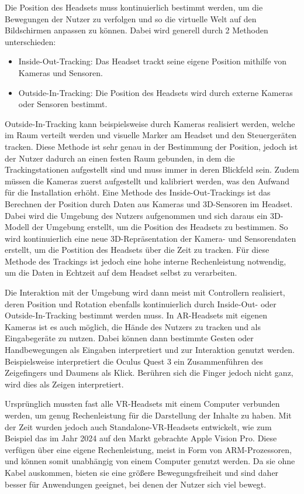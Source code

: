     Die Position des Headsets muss kontinuierlich bestimmt werden, um die Bewegungen der Nutzer zu verfolgen und so die virtuelle Welt auf den Bildschirmen anpassen zu können.
    Dabei wird generell durch 2 Methoden unterschieden:
    \begin{itemize}
      \item Inside-Out-Tracking: Das Headset trackt seine eigene Position mithilfe von Kameras und Sensoren.
      \item Outside-In-Tracking: Die Position des Headsets wird durch externe Kameras oder Sensoren bestimmt.
    \end{itemize}
    \autocite[]{Gourlay2017}

    Outside-In-Tracking kann beispielsweise durch Kameras realisiert werden, welche im Raum verteilt werden und visuelle Marker am Headset und den Steuergeräten tracken.
    Diese Methode ist sehr genau in der Bestimmung der Position, jedoch ist der Nutzer dadurch an einen festen Raum gebunden, in dem die Trackingstationen aufgestellt sind und muss immer in deren Blickfeld sein.
    Zudem müssen die Kameras zuerst aufgestellt und kalibriert werden, was den Aufwand für die Installation erhöht.
    Eine Methode des Inside-Out-Trackings ist das Berechnen der Position durch Daten aus Kameras und 3D-Sensoren im Headset.
    Dabei wird die Umgebung des Nutzers aufgenommen und sich daraus ein 3D-Modell der Umgebung erstellt, um die Position des Headsets zu bestimmen.
    So wird kontinuierlich eine neue 3D-Repräsentation der Kamera- und Sensorendaten erstellt, um die Postition des Headsets über die Zeit zu tracken.
    Für diese Methode des Trackings ist jedoch eine hohe interne Rechenleistung notwendig, um die Daten in Echtzeit auf dem Headset selbst zu verarbeiten.

    Die Interaktion mit der Umgebung wird dann meist mit Controllern realisiert, deren Position und Rotation ebenfalls kontinuierlich durch Inside-Out- oder Outside-In-Tracking bestimmt werden muss.
    In AR-Headsets mit eigenen Kameras ist es auch möglich, die Hände des Nutzers zu tracken und als Eingabegeräte zu nutzen.
    Dabei können dann bestimmte Gesten oder Handbewegungen als Eingaben interpretiert und zur Interaktion genutzt werden.
    Beispielsweise interpretiert die Oculus Quest 3 ein Zusammenführen des Zeigefingers und Daumens als Klick.
    Berühren sich die Finger jedoch nicht ganz, wird dies als Zeigen interpretiert.
    
    
    Ursprünglich mussten fast alle VR-Headsets mit einem Computer verbunden werden, um genug Rechenleistung für die Darstellung der Inhalte zu haben.
    Mit der Zeit wurden jedoch auch Standalone-VR-Headsets entwickelt, wie zum Beispiel das im Jahr 2024 auf den Markt gebrachte Apple Vision Pro.
    Diese verfügen über eine eigene Rechenleistung, meist in Form von ARM-Prozessoren, und können somit unabhängig von einem Computer genutzt werden.
    Da sie ohne Kabel auskommen, bieten sie eine größere Bewegungsfreiheit und sind daher besser für Anwendungen geeignet, bei denen der Nutzer sich viel bewegt.

